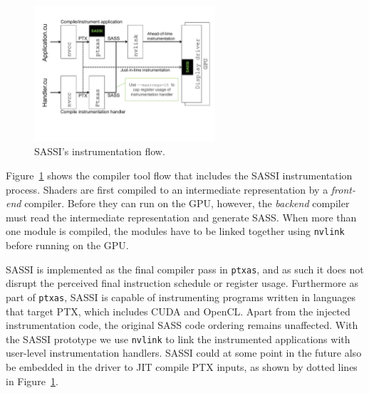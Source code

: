 \begin{figure}[t]
\center
\includegraphics[width=0.60\textwidth]{figures/sassi-flow.pdf}
\caption{SASSI's instrumentation flow.}
\label{fig:sassi-comp-flow}
\end{figure}

Figure~\ref{fig:sassi-comp-flow} shows the compiler tool flow that
includes the SASSI instrumentation process.  Shaders are first
compiled to an intermediate representation by a \emph{front-end}
compiler.  Before they can run on the GPU, however, the \emph{backend}
compiler must read the intermediate representation and generate
SASS\@. When more than one module is compiled, the modules have to be
linked together using \texttt{nvlink} before running on the GPU.

SASSI is implemented as the final compiler pass in \texttt{ptxas}, and
as such it does not disrupt the perceived final instruction schedule
or register usage.  Furthermore as part of \texttt{ptxas}, SASSI is
capable of instrumenting programs written in languages that target
PTX, which includes CUDA and OpenCL.  Apart from the injected
instrumentation code, the original SASS code ordering remains
unaffected. With the SASSI prototype we use \texttt{nvlink} to link
the instrumented applications with user-level instrumentation
handlers.  SASSI could at some point in the future also be embedded in
the driver to JIT compile PTX inputs, as shown by dotted lines in
Figure~\ref{fig:sassi-comp-flow}.
